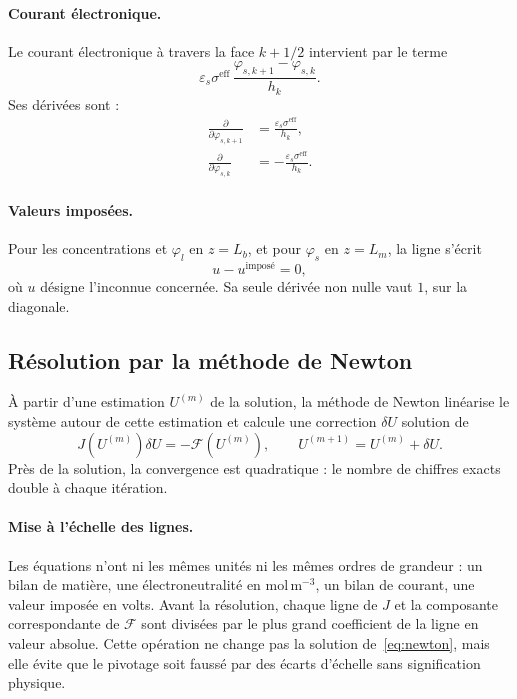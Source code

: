 \paragraph{Courant électronique.} Le courant électronique à travers la face
$k+1/2$ intervient par le terme
\begin{equation*}
\varepsilon_s\sigma^{\mathrm{eff}}\,\frac{\varphi_{s,k+1} - \varphi_{s,k}}{h_k} .
\end{equation*}
Ses dérivées sont :
\begin{align*}
\frac{\partial}{\partial \varphi_{s,k+1}} &= \frac{\varepsilon_s\sigma^{\mathrm{eff}}}{h_k} ,\\[0.2cm]
\frac{\partial}{\partial \varphi_{s,k}} &= -\frac{\varepsilon_s\sigma^{\mathrm{eff}}}{h_k} .
\end{align*}

\paragraph{Valeurs imposées.} Pour les concentrations et $\varphi_l$ en
$z = L_b$, et pour $\varphi_s$ en $z = L_m$, la ligne s'écrit
\begin{equation*}
u - u^{\text{imposé}} = 0 ,
\end{equation*}
où $u$ désigne l'inconnue concernée. Sa seule dérivée non nulle vaut $1$, sur
la diagonale.

\subsection*{Résolution par la méthode de Newton}

À partir d'une estimation $U^{(m)}$ de la solution, la méthode de Newton
linéarise le système autour de cette estimation et calcule une correction
$\delta U$ solution de
\begin{equation}
J\!\left(U^{(m)}\right)\delta U = -\mathcal{F}\!\left(U^{(m)}\right),
\qquad
U^{(m+1)} = U^{(m)} + \delta U .
\label{eq:newton}
\end{equation}
Près de la solution, la convergence est quadratique : le nombre de chiffres
exacts double à chaque itération.

\paragraph{Mise à l'échelle des lignes.} Les équations n'ont ni les mêmes
unités ni les mêmes ordres de grandeur : un bilan de matière, une
électroneutralité en mol\,m$^{-3}$, un bilan de courant, une valeur
imposée en volts. Avant la résolution, chaque ligne de $J$ et la composante
correspondante de $\mathcal{F}$ sont divisées par le plus grand coefficient
de la ligne en valeur absolue. Cette opération ne change pas la solution
de~\eqref{eq:newton}, mais elle évite que le pivotage soit faussé par des
écarts d'échelle sans signification physique.

